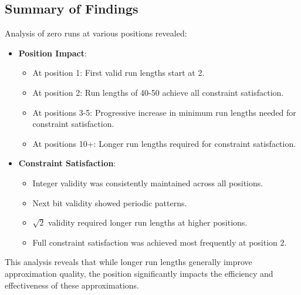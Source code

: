 \subsection{Summary of Findings}
Analysis of zero runs at various positions revealed:
\begin{itemize}
    \item \textbf{Position Impact}:
        \begin{itemize}
            \item At position 1: First valid run lengths start at 2.
            \item At position 2: Run lengths of 40-50 achieve all constraint satisfaction.
            \item At positions 3-5: Progressive increase in minimum run lengths needed for constraint
            satisfaction.
            \item At positions 10+: Longer run lengths required for constraint satisfaction.
        \end{itemize}
    \item \textbf{Constraint Satisfaction}:
        \begin{itemize}
            \item Integer validity was consistently maintained across all positions.
            \item Next bit validity showed periodic patterns.
            \item $\sqrt{2}$ validity required longer run lengths at higher positions.
            \item Full constraint satisfaction was achieved most frequently at position 2.
        \end{itemize}
\end{itemize}

This analysis reveals that while longer run lengths generally improve approximation quality,
the position significantly impacts the efficiency and effectiveness of these approximations.